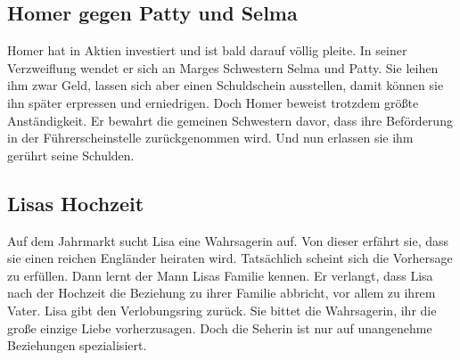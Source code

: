 \subsection{Homer gegen Patty und Selma}\label{2F14}
Homer hat in Aktien investiert und ist bald darauf völlig pleite. In seiner Verzweiflung wendet er sich an Marges Schwestern Selma und Patty. Sie leihen ihm zwar Geld, lassen sich aber einen Schuldschein ausstellen, damit können sie ihn später erpressen und erniedrigen. Doch Homer beweist trotzdem größte Anständigkeit. Er bewahrt die gemeinen Schwestern davor, dass ihre Be\-för\-der\-ung in der Führer\-schein\-stel\-le zurückgenommen wird. Und nun erlassen sie ihm gerührt seine Schulden.


	
\subsection{Lisas Hochzeit}\label{2F15}
Auf dem Jahrmarkt sucht Lisa eine Wahrsagerin auf. Von dieser erfährt sie, dass sie einen reichen Engländer heiraten wird. Tatsächlich scheint sich die Vorhersage zu erfüllen. Dann lernt der Mann Lisas Familie kennen. Er verlangt, dass Lisa nach der Hochzeit die Beziehung zu ihrer Familie abbricht, vor allem zu ihrem Vater. Lisa gibt den Verlobungsring zurück. Sie bittet die Wahrsagerin, ihr die große einzige Liebe vorherzusagen. Doch die Seherin ist nur auf unangenehme Beziehungen spezialisiert.


